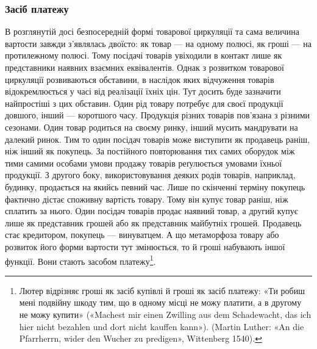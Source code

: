 \subsubsection{Засіб платежу}

В розглянутій досі безпосередній формі товарової циркуляції
та сама величина вартости завжди з’являлась двоїсто: як товар —
на одному полюсі, як гроші — на протилежному полюсі. Тому
посідачі товарів увіходили в контакт лише як представники
наявних взаємних еквівалентів. Однак з розвитком товарової
циркуляції розвиваються обставини, в наслідок яких відчуження
товарів відокремлюється у часі від реалізації їхніх цін. Тут
досить буде зазначити найпростіші з цих обставин. Один рід
товару потребує для своєї продукції довшого, інший — коротшого
часу. Продукція різних товарів пов’язана з різними сезонами.
Один товар родиться на своєму ринку, інший мусить мандрувати
на далекий ринок. Тим то один посідач товарів може виступити
як продавець раніш, ніж інший як покупець. За постійного повторювання
тих самих оборудок між тими самими особами умови
продажу товарів реґулюється умовами їхньої продукції. З другого
боку, використовування деяких родів товарів, наприклад,
будинку, продається на якийсь певний час. Лише по скінченні
терміну покупець фактично дістає споживну вартість товару.
Тому він купує товар раніш, ніж сплатить за нього. Один посідач
товарів продає наявний товар, а другий купує лише як представник
грошей або як представник майбутніх грошей. Продавець
стає кредитором, покупець — винуватцем. А що метаморфоза товару
або розвиток його форми вартости тут змінюється, то й гроші
набувають іншої функції. Вони стають засобом платежу\footnote{
Лютер відрізняє гроші як засіб купівлі й гроші як засіб платежу:
«Ти робиш мені подвійну шкоду тим, що в одному місці не можу платити,
а в другому не можу купити» («Machest mir einen Zwilling aus dem Schadewacht,
das ich hier nicht bezahlen und dort nicht kauffen kann»). (Martin Luther:
«An die Pfarrherrn, wider den Wucher zu predigen», Wittenberg 1540).
}.

